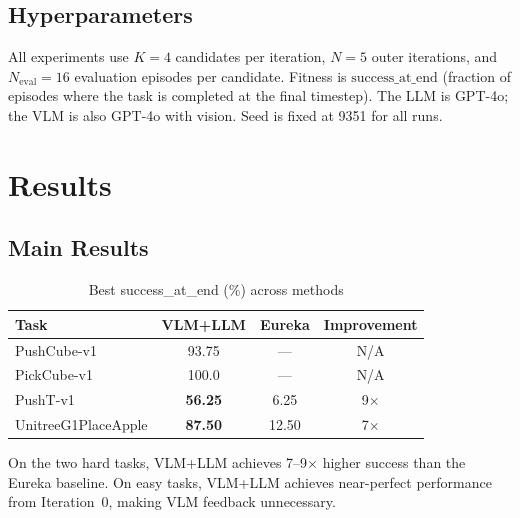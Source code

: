 \documentclass[conference]{IEEEtran}
\begin{document}
\subsection{Hyperparameters}

All experiments use $K=4$ candidates per iteration, $N=5$ outer iterations, and
$N_{\text{eval}}=16$ evaluation episodes per candidate. Fitness is
$\text{success\_at\_end}$ (fraction of episodes where the task is completed at
the final timestep). The LLM is GPT-4o; the VLM is also GPT-4o with vision.
Seed is fixed at 9351 for all runs.



\section{Results}\label{sec:results}

\subsection{Main Results}

\begin{table}[htbp]
\caption{Best success\_at\_end (\%) across methods}
\label{tab:main}
\centering
\begin{tabular}{lccc}
\toprule
Task & VLM+LLM & Eureka & Improvement \\
\midrule
PushCube-v1 & 93.75 & --- & N/A \\
PickCube-v1 & 100.0 & --- & N/A \\
PushT-v1 & \textbf{56.25} & 6.25 & 9$\times$ \\
UnitreeG1PlaceApple & \textbf{87.50} & 12.50 & 7$\times$ \\
\bottomrule
\end{tabular}
\end{table}


On the two hard tasks, VLM+LLM achieves 7--9$\times$ higher success than the
Eureka baseline. On easy tasks, VLM+LLM achieves near-perfect performance from
Iteration~0, making VLM feedback unnecessary.
\end{document}

